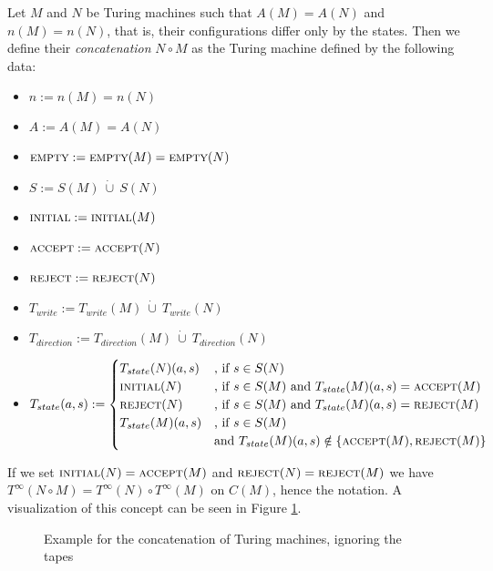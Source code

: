 \begin{Definition}
	Let $M$ and $N$ be Turing machines such that $A(M) = A(N)$ and $n(M) = n(N)$, that is, their configurations differ only by the states. Then we define their \emph{concatenation} $N \circ M$ as the Turing machine defined by the following data:
	\begin{itemize}
		\item{$n := n(M) = n(N)$}
		\item{$A := A(M) = A(N)$}
		\item{$\text{\scshape{empty}} := \text{\scshape{empty}}(M) = \text{\scshape{empty}}(N)$}
		\item{$S := S(M)~\dot\cup~S(N)$}
		\item{$\text{\scshape{initial}} := \text{\scshape{initial}}(M)$}
		\item{$\text{\scshape{accept}} := \text{\scshape{accept}}(N)$}
		\item{$\text{\scshape{reject}} := \text{\scshape{reject}}(N)$}
		\item{$T_{write} := T_{write}(M)~\dot\cup~T_{write}(N)$}
		\item{$T_{direction} := T_{direction}(M)~\dot\cup~T_{direction}(N)$}
		\item{$T_{state} (a,s) :=
			\begin{cases}
				T_{state}(N) (a,s) &\text{, if}~s \in S(N) \\
				\text{\scshape{initial}}(N) &\text{, if}~s \in S(M)~\text{and}~T_{state}(M)(a,s) = \text{\scshape{accept}}(M) \\
				\text{\scshape{reject}}(N) &\text{, if}~s \in S(M)~\text{and}~T_{state}(M)(a,s) = \text{\scshape{reject}}(M) \\
				T_{state}(M) (a,s) &\text{, if}~s \in S(M) \\&\text{and}~T_{state}(M)(a,s) \notin \{\text{\scshape{accept}}(M),\text{\scshape{reject}}(M)\}
			\end{cases}
		$}
	\end{itemize}
\end{Definition}
\begin{Remark}
	\label{turing_machines:basic_notions:remark_concatenation}
	If we set $\text{\scshape{initial}}(N) = \text{\scshape{accept}}(M)$ and $\text{\scshape{reject}}(N) = \text{\scshape{reject}}(M)$ we have $T^\infty(N \circ M) = T^\infty(N) \circ T^\infty(M)$ on $C(M)$, hence the notation. A visualization of this concept can be seen in Figure \ref{turing_machines:basic_notions:fig_concatenation}.
\end{Remark}
\begin{figure}[h]
	\centering
	
	\caption{Example for the concatenation of Turing machines, ignoring the tapes}
	\label{turing_machines:basic_notions:fig_concatenation}
\end{figure}
